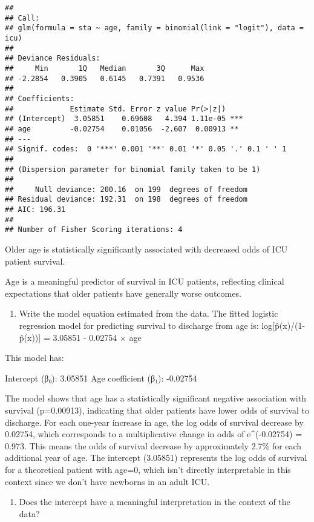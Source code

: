 \documentclass[
]{article}
\providecommand{\tightlist}{%
  \setlength{\itemsep}{0pt}\setlength{\parskip}{0pt}}
\begin{document}
\begin{verbatim}
## 
## Call:
## glm(formula = sta ~ age, family = binomial(link = "logit"), data = icu)
## 
## Deviance Residuals: 
##     Min       1Q   Median       3Q      Max  
## -2.2854   0.3905   0.6145   0.7391   0.9536  
## 
## Coefficients:
##             Estimate Std. Error z value Pr(>|z|)    
## (Intercept)  3.05851    0.69608   4.394 1.11e-05 ***
## age         -0.02754    0.01056  -2.607  0.00913 ** 
## ---
## Signif. codes:  0 '***' 0.001 '**' 0.01 '*' 0.05 '.' 0.1 ' ' 1
## 
## (Dispersion parameter for binomial family taken to be 1)
## 
##     Null deviance: 200.16  on 199  degrees of freedom
## Residual deviance: 192.31  on 198  degrees of freedom
## AIC: 196.31
## 
## Number of Fisher Scoring iterations: 4
\end{verbatim}

Older age is statistically significantly associated with decreased odds
of ICU patient survival.

Age is a meaningful predictor of survival in ICU patients, reflecting
clinical expectations that older patients have generally worse outcomes.

\begin{enumerate}
\def\labelenumi{\alph{enumi})}
\tightlist
\item
  Write the model equation estimated from the data. The fitted logistic
  regression model for predicting survival to discharge from age is:
  log{[}p̂(x)/(1-p̂(x)){]} = 3.05851 - 0.02754 × age
\end{enumerate}

This model has:

Intercept (β₀): 3.05851 Age coefficient (β₁): -0.02754

The model shows that age has a statistically significant negative
association with survival (p=0.00913), indicating that older patients
have lower odds of survival to discharge. For each one-year increase in
age, the log odds of survival decrease by 0.02754, which corresponds to
a multiplicative change in odds of e\^{}(-0.02754) = 0.973. This means
the odds of survival decrease by approximately 2.7\% for each additional
year of age. The intercept (3.05851) represents the log odds of survival
for a theoretical patient with age=0, which isn't directly interpretable
in this context since we don't have newborns in an adult ICU.

\begin{enumerate}
\def\labelenumi{\alph{enumi})}
\setcounter{enumi}{1}
\tightlist
\item
  Does the intercept have a meaningful interpretation in the context of
  the data?
\end{enumerate}
\end{document}

